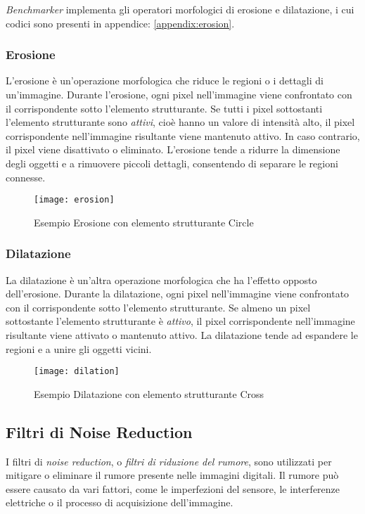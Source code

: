 \noindent \textit{Benchmarker} implementa gli operatori morfologici di erosione e dilatazione, i cui codici sono presenti in appendice: \ref{appendix:erosion}.

\subsubsection{Erosione}
L'erosione è un'operazione morfologica che riduce le regioni o i dettagli di un'immagine. Durante l'erosione, ogni pixel nell'immagine viene confrontato con il corrispondente sotto l'elemento strutturante. Se tutti i pixel sottostanti l'elemento strutturante sono \textit{attivi}, cioè hanno un valore di intensità alto, il pixel corrispondente nell'immagine risultante viene mantenuto attivo. In caso contrario, il pixel viene disattivato o eliminato. L'erosione tende a ridurre la dimensione degli oggetti e a rimuovere piccoli dettagli, consentendo di separare le regioni connesse.

\begin{figure}[H]
	\centering
	\texttt{[image: erosion]}
	\caption{Esempio Erosione con elemento strutturante Circle}
\end{figure}

\subsubsection{Dilatazione}
La dilatazione è un'altra operazione morfologica che ha l'effetto opposto dell'erosione. Durante la dilatazione, ogni pixel nell'immagine viene confrontato con il corrispondente sotto l'elemento strutturante. Se almeno un pixel sottostante l'elemento strutturante è \textit{attivo}, il pixel corrispondente nell'immagine risultante viene attivato o mantenuto attivo. La dilatazione tende ad espandere le regioni e a unire gli oggetti vicini.


\begin{figure}[H]
	\centering
	\texttt{[image: dilation]}
	\caption{Esempio Dilatazione con elemento strutturante Cross}
\end{figure}

\subsection{Filtri di Noise Reduction}
I filtri di \textit{noise reduction}, o \textit{filtri di riduzione del rumore}, sono utilizzati per mitigare o eliminare il rumore presente nelle immagini digitali. Il rumore può essere causato da vari fattori, come le imperfezioni del sensore, le interferenze elettriche o il processo di acquisizione dell'immagine.

